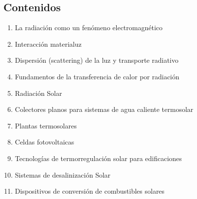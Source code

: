 \documentclass[letterpaper,10pt,english]{jupyterBook}
\begin{document}
\subsection{Contenidos}
\label{\detokenize{0_introduccion/0_introduccion:contenidos}}\begin{enumerate}
%
\item {} 
\sphinxAtStartPar
La radiación como un fenómeno electromagnético

\item {} 
\sphinxAtStartPar
Interacción materia\sphinxhyphen{}luz

\item {} 
\sphinxAtStartPar
Dispersión (scattering) de la luz y transporte radiativo

\item {} 
\sphinxAtStartPar
Fundamentos de la transferencia de calor por radiación

\item {} 
\sphinxAtStartPar
Radiación Solar

\item {} 
\sphinxAtStartPar
Colectores planos para sistemas de agua caliente termosolar

\item {} 
\sphinxAtStartPar
Plantas termosolares

\item {} 
\sphinxAtStartPar
Celdas fotovoltaicas

\item {} 
\sphinxAtStartPar
Tecnologías de termorregulación solar para edificaciones

\item {} 
\sphinxAtStartPar
Sistemas de desalinización Solar

\item {} 
\sphinxAtStartPar
Dispositivos de conversión de combustibles solares

\end{enumerate}
\end{document}
